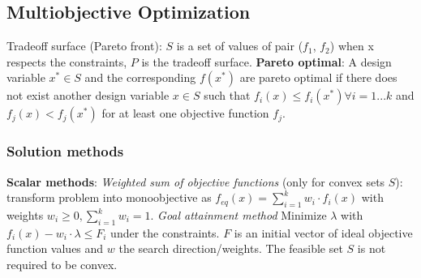 \subsection*{Multiobjective Optimization}
Tradeoff surface (Pareto front): $S$ is a set of values of pair ($f_1$, $f_2$) when x respects the constraints, $P$ is the tradeoff surface.
\textbf{Pareto optimal}: A design variable $x^* \in S$ and the corresponding $f(x^*)$ are pareto optimal if there does not exist another design variable $x\in S$ such that $f_i (x) \leq f_i (x^*) \forall i = 1 ... k$ and $f_j (x) < f_j (x^*)$ for at least one objective function $f_j$.


\subsubsection*{Solution methods}
\textbf{Scalar methods}: 
\textit{Weighted sum of objective functions} (only for convex sets $S$): transform problem into monoobjective as $f_{eq}(x) = \sum_{i=1}^k w_i \cdot f_i(x)$ with weights $w_i \geq 0, \sum_{i=1}^k w_i = 1$. 
\textit{Goal attainment method} 
Minimize $\lambda$ with $f_i (x) - w_i \cdot \lambda \leq F_i$ under the constraints. 
$F$ is an initial vector of ideal objective function values and $w$ the search direction/weights. 
The feasible set $S$ is not required to be convex.

